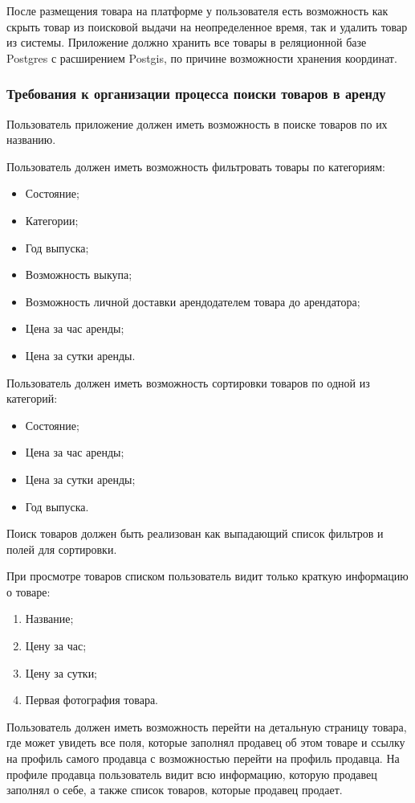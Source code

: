 После размещения товара на платформе у пользователя есть возможность как скрыть товар из поисковой выдачи на неопределенное время, так и удалить товар из системы.
Приложение должно хранить все товары в реляционной базе Postgres с расширением Postgis, по причине возможности хранения координат.

\subsubsection{Требования к организации процесса поиски товаров в аренду}
Пользователь приложение должен иметь возможность в поиске товаров по их названию.

Пользователь должен иметь возможность фильтровать товары по категориям:
\begin{itemize}
    \item Состояние;
    \item Категории;
    \item Год выпуска;
    \item Возможность выкупа;
    \item Возможность личной доставки арендодателем товара до арендатора;
    \item Цена за час аренды;
    \item Цена за сутки аренды.
\end{itemize}

Пользователь должен иметь возможность сортировки товаров по одной из категорий:
\begin{itemize}
    \item Состояние;
    \item Цена за час аренды;
    \item Цена за сутки аренды;
    \item Год выпуска.
\end{itemize}

Поиск товаров должен быть реализован как выпадающий список фильтров и полей для сортировки.

При просмотре товаров списком пользователь видит только краткую информацию о товаре:
\begin{enumerate}[label=\arabic*)]
    \item Название;
    \item Цену за час;
    \item Цену за сутки;
    \item Первая фотография товара.
\end{enumerate}

Пользователь должен иметь возможность перейти на детальную страницу товара, где может увидеть все поля, которые заполнял продавец об этом товаре и ссылку на профиль самого продавца с возможностью перейти на профиль продавца.
На профиле продавца пользователь видит всю информацию, которую продавец заполнял о себе, а также список товаров, которые продавец продает.

